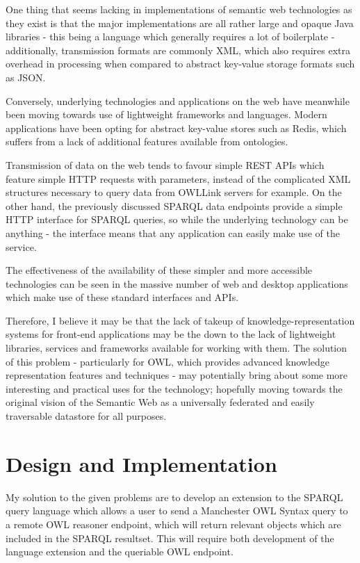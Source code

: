 \documentclass{article}
\begin{document}

One thing that seems lacking in implementations of semantic web technologies as
they exist is that the major implementations are all rather large and opaque
Java libraries - this being a language which generally requires a lot of
boilerplate - additionally, transmission formats are commonly XML, which also
requires extra overhead in processing when compared to abstract key-value
storage formats such as JSON. 

Conversely, underlying technologies and applications on the web have meanwhile 
been moving towards use of lightweight frameworks and languages. Modern applications 
have been opting for abstract key-value stores such as Redis, which suffers from
a lack of additional features available from ontologies. 

Transmission of data on the web tends to favour simple REST APIs which feature 
simple HTTP requests with parameters, instead of the complicated XML structures 
necessary to query data from OWLLink servers for example. On the other hand, the
previously discussed SPARQL data endpoints provide a simple HTTP interface for
SPARQL queries, so while the underlying technology can be anything - the
interface means that any application can easily make use of the service.

The effectiveness of the availability of these simpler and more accessible 
technologies can be seen in the massive number of web and desktop applications
which make use of these standard interfaces and APIs.

Therefore, I believe it may be that the lack of takeup of knowledge-representation systems
for front-end applications may be the down to the lack of lightweight libraries, 
services and frameworks available for working with them. The solution of this
problem - particularly for OWL, which provides advanced knowledge representation
features and techniques - may potentially bring about some more interesting and
practical uses for the technology; hopefully moving towards the original vision
of the Semantic Web as a universally federated and easily traversable datastore
for all purposes.


\section{Design and Implementation}

My solution to the given problems are to develop an extension to the SPARQL
query language which allows a user to send a Manchester OWL Syntax query to a
remote OWL reasoner endpoint, which will return relevant objects which are
included in the SPARQL resultset. This will require both development of the
language extension and the queriable OWL endpoint.
\end{document}
